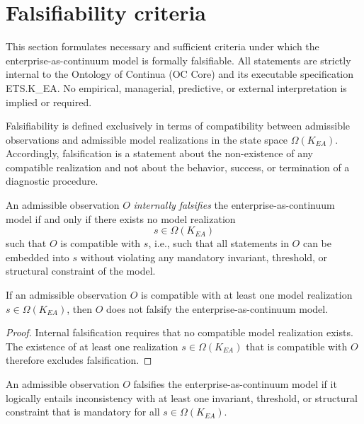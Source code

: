 ﻿\section{Falsifiability criteria}
\label{sec:falsifiability-criteria}

This section formulates necessary and sufficient criteria under which the
enterprise-as-continuum model is formally falsifiable.
All statements are strictly internal to the Ontology of Continua (OC Core)
and its executable specification ETS.K\_EA.
No empirical, managerial, predictive, or external interpretation is
implied or required.

\medskip

Falsifiability is defined exclusively in terms of compatibility between
admissible observations and admissible model realizations in the state
space \(\Omega(K_{EA})\).
Accordingly, falsification is a statement about the non-existence of any
compatible realization and not about the behavior, success, or termination
of a diagnostic procedure.

\medskip

\begin{definition}
An admissible observation \(O\) \emph{internally falsifies} the
enterprise-as-continuum model if and only if there exists no model
realization
\[
s \in \Omega(K_{EA})
\]
such that \(O\) is compatible with \(s\), i.e., such that all statements in
\(O\) can be embedded into \(s\) without violating any mandatory invariant,
threshold, or structural constraint of the model.
\end{definition}

\medskip

\begin{theorem}
\label{thm:necessary-falsifiability}
If an admissible observation \(O\) is compatible with at least one model
realization \(s \in \Omega(K_{EA})\), then \(O\) does not falsify the
enterprise-as-continuum model.
\end{theorem}

\begin{proof}
Internal falsification requires that no compatible model realization
exists.
The existence of at least one realization
\(s \in \Omega(K_{EA})\) that is compatible with \(O\) therefore excludes
falsification.
\end{proof}

\medskip

\begin{theorem}
\label{thm:sufficient-falsifiability}
An admissible observation \(O\) falsifies the enterprise-as-continuum model
if it logically entails inconsistency with at least one invariant,
threshold, or structural constraint that is mandatory for all
\(s \in \Omega(K_{EA})\).
\end{theorem}

